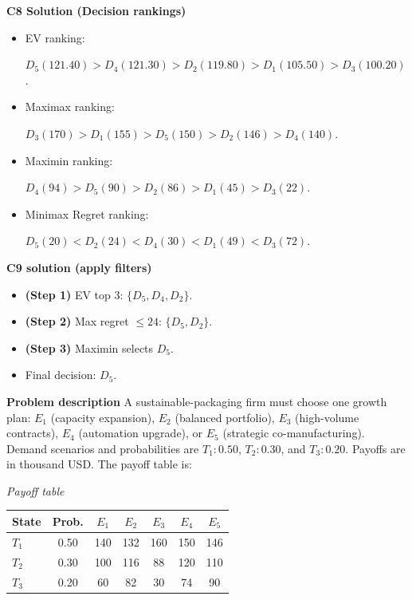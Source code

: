 \begin{ExamProblems}
		\textbf{C8 Solution (Decision rankings)}\par
		\begin{itemize}
			\item EV ranking: \par $D_5(121.40)>D_4(121.30)>D_2(119.80)>D_1(105.50)>D_3(100.20)$.
			\item Maximax ranking:\par $D_3(170)>D_1(155)>D_5(150)>D_2(146)>D_4(140)$.
			\item Maximin ranking: \par $D_4(94)>D_5(90)>D_2(86)>D_1(45)>D_3(22)$.
			\item Minimax Regret ranking:\par $D_5(20)<D_2(24)<D_4(30)<D_1(49)<D_3(72)$.
		\end{itemize}
		
		\textbf{C9 solution (apply filters)}\par
		\begin{itemize}
			\item \textbf{(Step 1)} EV top 3: $\{D_5,D_4,D_2\}$.
			\item \textbf{(Step 2)} Max regret $\leq 24$: $\{D_5,D_2\}$.
			\item \textbf{(Step 3)} Maximin selects $D_5$.
			\item Final decision: $D_5$.
		\end{itemize}
		
		\newpage
		\item
		\textbf{Problem description}
		A sustainable-packaging firm must choose one growth plan: $E_1$ (capacity expansion), $E_2$ (balanced portfolio), $E_3$ (high-volume contracts), $E_4$ (automation upgrade), or $E_5$ (strategic co-manufacturing).
		Demand scenarios and probabilities are $T_1:0.50$, $T_2:0.30$, and $T_3:0.20$. Payoffs are in thousand USD. The payoff table is:
		
		\begin{center}
			\textit{Payoff table} \\
			\begin{tabular}{l c c c c c c}
				\hline
				State& Prob. & $E_1$ & $E_2$ & $E_3$ & $E_4$ & $E_5$ \\
				\hline
				$T_1$ & 0.50 & 140 & 132 & 160 & 150 & 146 \\
				$T_2$ & 0.30 & 100 & 116 & 88 & 120 & 110 \\
				$T_3$ & 0.20 & 60 & 82 & 30 & 74 & 90 \\
				\hline
			\end{tabular}
		\end{center}
		

\end{ExamProblems}
